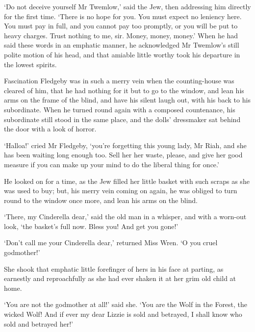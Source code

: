 ‘Do not deceive yourself Mr Twemlow,’ said the Jew, then addressing him
directly for the first time. ‘There is no hope for you. You must expect
no leniency here. You must pay in full, and you cannot pay too promptly,
or you will be put to heavy charges. Trust nothing to me, sir. Money,
money, money.’ When he had said these words in an emphatic manner, he
acknowledged Mr Twemlow’s still polite motion of his head, and that
amiable little worthy took his departure in the lowest spirits.

Fascination Fledgeby was in such a merry vein when the counting-house
was cleared of him, that he had nothing for it but to go to the window,
and lean his arms on the frame of the blind, and have his silent laugh
out, with his back to his subordinate. When he turned round again with a
composed countenance, his subordinate still stood in the same place, and
the dolls’ dressmaker sat behind the door with a look of horror.

‘Halloa!’ cried Mr Fledgeby, ‘you’re forgetting this young lady, Mr
Riah, and she has been waiting long enough too. Sell her her waste,
please, and give her good measure if you can make up your mind to do the
liberal thing for once.’

He looked on for a time, as the Jew filled her little basket with such
scraps as she was used to buy; but, his merry vein coming on again, he
was obliged to turn round to the window once more, and lean his arms on
the blind.

‘There, my Cinderella dear,’ said the old man in a whisper, and with a
worn-out look, ‘the basket’s full now. Bless you! And get you gone!’

‘Don’t call me your Cinderella dear,’ returned Miss Wren. ‘O you cruel
godmother!’

She shook that emphatic little forefinger of hers in his face at
parting, as earnestly and reproachfully as she had ever shaken it at her
grim old child at home.

‘You are not the godmother at all!’ said she. ‘You are the Wolf in
the Forest, the wicked Wolf! And if ever my dear Lizzie is sold and
betrayed, I shall know who sold and betrayed her!’



